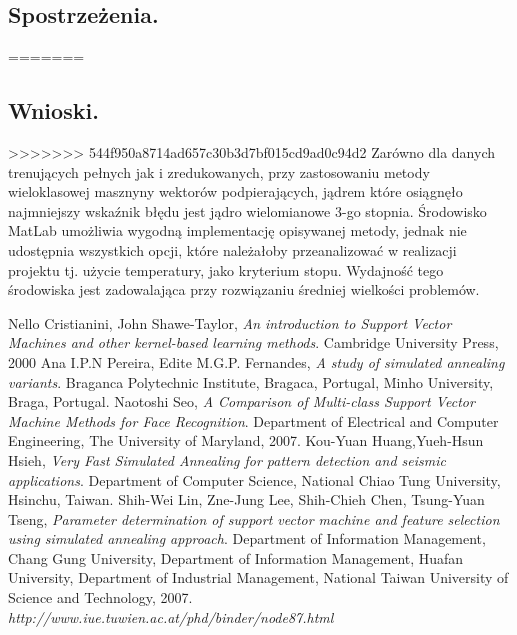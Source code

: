 \documentclass{article}
\begin{document}
\subsection{Spostrzeżenia.}
=======
\subsection{Wnioski.}
>>>>>>> 544f950a8714ad657c30b3d7bf015cd9ad0c94d2
Zarówno dla danych trenujących pełnych jak i zredukowanych, przy zastosowaniu metody wieloklasowej 
masznyny wektorów podpierających, jądrem które osiągnęło najmniejszy wskaźnik błędu jest jądro wielomianowe
3-go stopnia.\linebreak
Środowisko MatLab umożliwia wygodną implementację opisywanej metody, jednak nie udostępnia wszystkich opcji, które
należałoby przeanalizować w realizacji projektu tj. użycie temperatury, jako kryterium stopu. Wydajność tego środowiska jest zadowalająca przy rozwiązaniu średniej wielkości problemów.

\pagebreak
\begin{thebibliography}{9}
Nello Cristianini, John Shawe-Taylor, \emph{An introduction to Support Vector Machines and other kernel-based learning methods}.
Cambridge University Press,
2000
Ana I.P.N Pereira, Edite M.G.P. Fernandes, \emph{A study of simulated annealing variants}.
Braganca Polytechnic Institute, Bragaca, Portugal,
Minho University, Braga, Portugal.
Naotoshi Seo, \emph{A Comparison of Multi-class Support Vector Machine Methods for Face Recognition}. 
Department of Electrical and Computer Engineering, The University of Maryland, 
2007.
Kou-Yuan Huang,Yueh-Hsun Hsieh, \emph{Very Fast Simulated Annealing for pattern detection and seismic applications}. Department of Computer Science, National Chiao Tung University, Hsinchu, Taiwan.
Shih-Wei Lin, Zne-Jung Lee, Shih-Chieh Chen, Tsung-Yuan Tseng, \emph{Parameter determination of support vector machine and feature selection using simulated annealing approach}. Department of Information Management, Chang Gung University, Department of Information Management, Huafan University, Department of Industrial Management, National Taiwan University of Science and Technology, 2007.
\emph{http://www.iue.tuwien.ac.at/phd/binder/node87.html}
\end{thebibliography}
\end{document}

